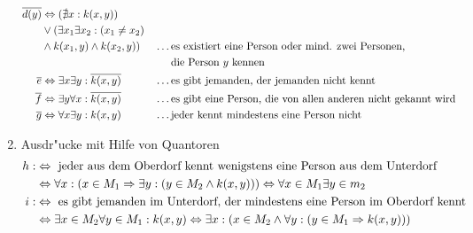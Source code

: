 \begin{enumerate}[label=\alph*)]
\begin{align*}
		\overline{d(y)}&\Leftrightarrow(\nexists x:k(x,y))\\
		&\lor(\exists x_1\exists x_2:(x_1\neq x_2)\\
		&\land k(x_1,y)\land k(x_2,y))&&\dots\text{es existiert eine Person oder mind. zwei Personen,}\\
		& &&\text{\enskip\enskip\enskip die Person }y\text{ kennen}\\
		\overline{e}&\Leftrightarrow\exists x\exists y:\overline{k(x,y)}&&\dots\text{es gibt jemanden, der jemanden nicht kennt}\\
		\overline{f}&\Leftrightarrow\exists y\forall x:\overline{k(x,y)}&&\dots\text{es gibt eine Person, die von allen anderen nicht gekannt wird}\\
		\overline{g}&\Leftrightarrow\forall x\exists y:k(x,y)&&\dots\text{jeder kennt mindestens eine Person nicht}
	\end{align*}
	\item Ausdr"ucke mit Hilfe von Quantoren
	\begin{align*}
		h:&\Leftrightarrow\text{ jeder aus dem Oberdorf kennt wenigstens eine Person aus dem Unterdorf}\\
		&\Leftrightarrow\forall x:(x\in M_1\Rightarrow\exists y:(y\in M_2\land k(x,y)))\Leftrightarrow\forall x\in M_1\exists y\in m_2\\
		i:&\Leftrightarrow\text{ es gibt jemanden im Unterdorf, der mindestens eine Person im Oberdorf kennt}\\
		&\Leftrightarrow\exists x\in M_2\forall y\in M_1:k(x,y)\Leftrightarrow\exists x:(x\in M_2\land\forall y:(y\in M_1\Rightarrow k(x,y)))
	\end{align*}
\end{enumerate}